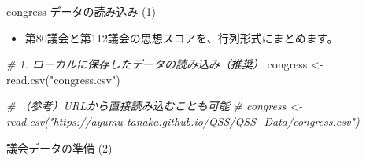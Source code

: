 \documentclass[
  ignorenonframetext,
]{beamer}
\newenvironment{Shaded}{\begin{snugshade}}{\end{snugshade}}
\newcommand{\CommentTok}[1]{\textcolor[rgb]{0.56,0.35,0.01}{\textit{#1}}}
\newcommand{\DecValTok}[1]{\textcolor[rgb]{0.00,0.00,0.81}{#1}}
\newcommand{\FunctionTok}[1]{\textcolor[rgb]{0.00,0.00,0.00}{#1}}
\newcommand{\NormalTok}[1]{#1}
\newcommand{\OtherTok}[1]{\textcolor[rgb]{0.56,0.35,0.01}{#1}}
\newcommand{\SpecialCharTok}[1]{\textcolor[rgb]{0.00,0.00,0.00}{#1}}
\newcommand{\StringTok}[1]{\textcolor[rgb]{0.31,0.60,0.02}{#1}}
\providecommand{\tightlist}{%
  \setlength{\itemsep}{0pt}\setlength{\parskip}{0pt}}
\begin{document}
\begin{frame}[fragile]{congress データの読み込み (1)}
\protect\hypertarget{congress-ux30c7ux30fcux30bfux306eux8aadux307fux8fbcux307f-1}{}
\begin{itemize}
\tightlist
\item
  第80議会と第112議会の思想スコアを、行列形式にまとめます。
\end{itemize}

\scriptsize

\begin{Shaded}
\begin{Highlighting}[]
\CommentTok{\# 1. ローカルに保存したデータの読み込み（推奨）}
\NormalTok{congress }\OtherTok{\textless{}{-}} \FunctionTok{read.csv}\NormalTok{(}\StringTok{"congress.csv"}\NormalTok{)}

\CommentTok{\# （参考）URLから直接読み込むことも可能}
\CommentTok{\# congress \textless{}{-} read.csv("https://ayumu{-}tanaka.github.io/QSS/QSS\_Data/congress.csv")}
\end{Highlighting}
\end{Shaded}

\normalsize
\end{frame}

\begin{frame}[fragile]{議会データの準備 (2)}
\protect\hypertarget{ux8b70ux4f1aux30c7ux30fcux30bfux306eux6e96ux5099-2}{}
\scriptsize

\begin{Shaded}
\end{Shaded}

\normalsize
\end{frame}
\end{document}
